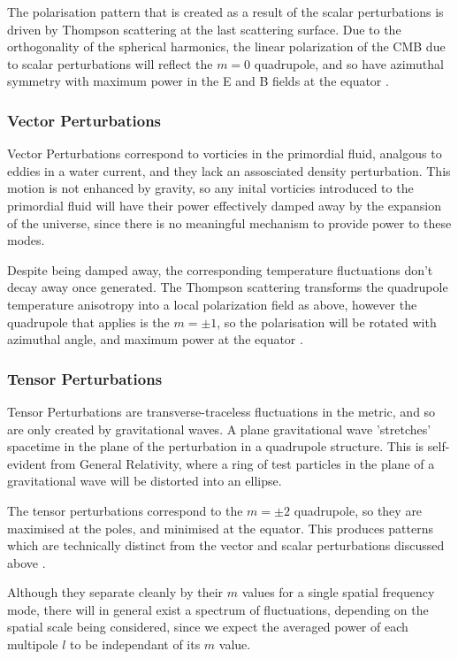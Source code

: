 The polarisation pattern that is created as a result of the scalar perturbations is driven by Thompson scattering at the last scattering surface. Due to the orthogonality of the spherical harmonics, the linear polarization of the CMB due to scalar perturbations will reflect the $m=0$ quadrupole, and so have azimuthal symmetry with maximum power in the E and B fields at the equator \cite{Hu:Polarisation}.

\subsubsection{Vector Perturbations}
Vector Perturbations correspond to vorticies in the primordial fluid, analgous to eddies in a water current, and they lack an assosciated density perturbation. This motion is not enhanced by gravity, so any inital vorticies introduced to the primordial fluid will have their power effectively damped away by the expansion of the universe, since there is no meaningful mechanism to provide power to these modes.

Despite being damped away, the corresponding temperature fluctuations don't decay away once generated. The Thompson scattering transforms the quadrupole temperature anisotropy into a local polarization field as above, however the quadrupole that applies is the $m=\pm 1$, so the polarisation will be rotated with azimuthal angle, and maximum power at the equator \cite{Hu:Polarisation}.

\subsubsection{Tensor Perturbations}
Tensor Perturbations are transverse-traceless fluctuations in the metric, and so are only created by gravitational waves. A plane gravitational wave 'str\-etch\-es' spacetime in the plane of the perturbation in a quadrupole structure. This is self- evident from General Relativity, where a ring of test particles in the plane of a gravitational wave will be distorted into an ellipse.

The tensor perturbations correspond to the $m=\pm 2$ quadrupole, so they are maximised at the poles, and minimised at the equator. This produces patterns which are technically distinct from the vector and scalar perturbations discussed above \cite{Hu:Polarisation}.

\par Although they separate cleanly by their $m$ values for a single spatial frequency mode, there will in general exist a spectrum of fluctuations, depending on the spatial scale being considered, since we expect the averaged power of each multipole $l$ to be independant of its $m$ value.

